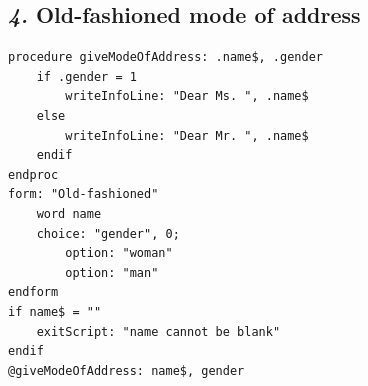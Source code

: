 \documentclass[12pt, english]{article}
\begin{document}
\subsection*{\emph{4.} Old-fashioned mode of address}

\begin{lstlisting}
procedure giveModeOfAddress: .name$, .gender
	if .gender = 1
		writeInfoLine: "Dear Ms. ", .name$
	else 
		writeInfoLine: "Dear Mr. ", .name$
	endif
endproc
form: "Old-fashioned"
	word name
	choice: "gender", 0;
		option: "woman"
		option: "man"
endform
if name$ = ""
	exitScript: "name cannot be blank"
endif
@giveModeOfAddress: name$, gender
\end{lstlisting}

\end{document}
